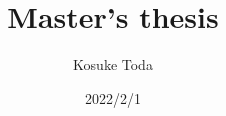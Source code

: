 \title{Master's thesis}
\author{Kosuke Toda}
\date{2022/2/1}
\maketitle
\clearpage
\setcounter{page}{0}
